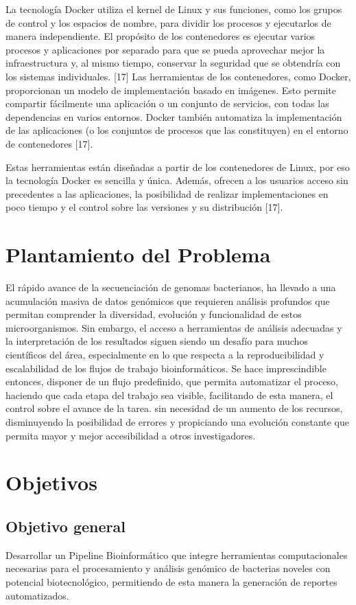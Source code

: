\documentclass[12pt]{article}
\begin{document}
La tecnología Docker utiliza el kernel de Linux y sus funciones, como los grupos 
de control y los espacios de nombre, para dividir los procesos y ejecutarlos de 
manera independiente. El propósito de los contenedores es ejecutar varios procesos 
y aplicaciones por separado para que se pueda aprovechar mejor la infraestructura y, 
al mismo tiempo, conservar la seguridad que se obtendría con los 
sistemas individuales. [17] Las herramientas de los contenedores, 
como Docker, proporcionan un modelo de implementación basado en imágenes. 
Esto permite compartir fácilmente una aplicación o un conjunto de servicios, 
con todas las dependencias en varios entornos. Docker también automatiza la 
implementación de las aplicaciones (o los conjuntos de procesos que las constituyen) 
en el entorno de contenedores [17].

Estas herramientas están diseñadas a partir de los contenedores de Linux, por 
eso la tecnología Docker es sencilla y única. Además, ofrecen a los usuarios 
acceso sin precedentes a las aplicaciones, la posibilidad de realizar 
implementaciones en poco tiempo y el control sobre las versiones y 
su distribución [17].

\newpage
\section{Plantamiento del Problema}
El rápido avance  de la secuenciación de genomas bacterianos, ha 
llevado a una acumulación masiva de datos genómicos que requieren 
análisis profundos que permitan comprender la diversidad, evolución 
y funcionalidad de estos microorganismos. Sin embargo, el acceso a 
herramientas de análisis adecuadas y la interpretación de los 
resultados siguen siendo un desafío para muchos científicos del 
área, especialmente en lo que respecta a la reproducibilidad y 
escalabilidad de los flujos de trabajo bioinformáticos. Se hace 
imprescindible entonces, disponer de un flujo predefinido, que 
permita automatizar el proceso, haciendo que cada etapa del trabajo 
sea visible, facilitando de esta manera, el control sobre el 
avance de la tarea. sin necesidad de un aumento de los recursos, 
disminuyendo la posibilidad de errores y  propiciando una evolución 
constante que permita mayor y mejor accesibilidad a otros 
investigadores.

\newpage
\section{Objetivos}
\subsection{Objetivo general}
Desarrollar un Pipeline Bioinformático que integre herramientas  computacionales 
necesarias para el procesamiento y  análisis genómico de bacterias noveles con potencial 
biotecnológico, permitiendo de esta manera la generación de reportes automatizados.
\end{document}

